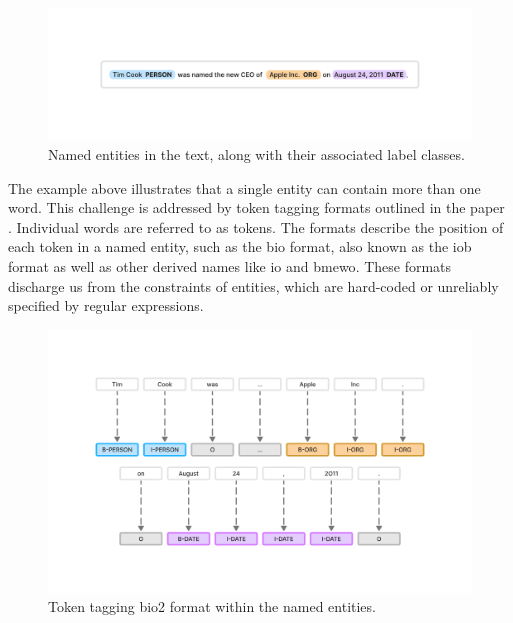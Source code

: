 \begin{figure}[htbp]
    \centering
    \includegraphics[width=\textwidth]{img/theoretical/ner-theoretical-example.pdf}
    \caption{Named entities in the text, along with their associated label classes.}
    \label{fig:named-entity-recognition-theoretical-example}
\end{figure}

The example above illustrates that a single entity can contain more than one word. This challenge is addressed by token tagging formats outlined in the paper \parencite{ramshaw-marcus-1995-text}. Individual words are referred to as tokens. The formats describe the position of each token in a named entity, such as the \acrfull{bio} format, also known as the \acrfull{iob} format as well as other derived names like \acrfull{io} and \acrfull{bmewo}. These formats discharge us from the constraints of entities, which are hard-coded or unreliably specified by regular expressions.

\begin{figure}[htbp]
    \centering
    \includegraphics[width=\textwidth]{img/theoretical/ner-theoretical-example-tags.pdf}
    \caption{Token tagging \acrshort{bio}2 format within the named entities.}
    \label{fig:named-entity-recognition-theoretical-example-tags}
\end{figure}

